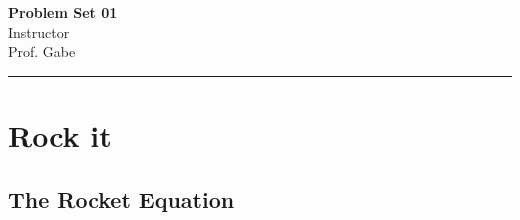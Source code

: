\documentclass[11pt,letterpaper]{article}
\newif\ifshow
\begin{document}
\begin{center}
\ifshow
  \textbf{\Large Problem Set 01 Solution}\\
\else
  \textbf{\Large Problem Set 01}\\
\fi
Instructor \\ Prof. Gabe\\
\end{center}

\hrule

\vspace{0.2cm}

\section{Rock it}
\subsection*{The Rocket Equation}
\end{document}
